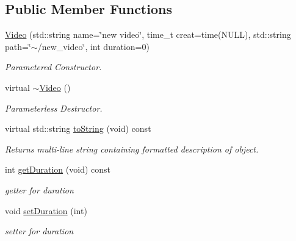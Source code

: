 \subsection*{Public Member Functions}
\begin{DoxyCompactItemize}
\item 
\hypertarget{classVideo_ad0277d8e5772008e22ac2948e03e103b}{\hyperlink{classVideo_ad0277d8e5772008e22ac2948e03e103b}{Video} (std\-::string name=\char`\"{}new video\char`\"{}, time\-\_\-t creat=time(N\-U\-L\-L), std\-::string path=\char`\"{}$\sim$/new\-\_\-video\char`\"{}, int duration=0)}\label{classVideo_ad0277d8e5772008e22ac2948e03e103b}

\begin{DoxyCompactList}\small\item\em Parametered Constructor. \end{DoxyCompactList}\item 
virtual \hyperlink{classVideo_aebf7e2a8fa2bbd79335b1cf35925d190}{$\sim$\-Video} ()
\begin{DoxyCompactList}\small\item\em Parameterless Destructor. \end{DoxyCompactList}\item 
\hypertarget{classVideo_af09cd9142969d63b514a251769fbed86}{virtual std\-::string \hyperlink{classVideo_af09cd9142969d63b514a251769fbed86}{to\-String} (void) const }\label{classVideo_af09cd9142969d63b514a251769fbed86}

\begin{DoxyCompactList}\small\item\em Returns multi-\/line string containing formatted description of object. \end{DoxyCompactList}\item 
\hypertarget{classVideo_a1a495dbb8b0389e092758c62144ebc45}{int \hyperlink{classVideo_a1a495dbb8b0389e092758c62144ebc45}{get\-Duration} (void) const }\label{classVideo_a1a495dbb8b0389e092758c62144ebc45}

\begin{DoxyCompactList}\small\item\em getter for duration \end{DoxyCompactList}\item 
\hypertarget{classVideo_a0fbbf03b902423efa2179142902bb0d0}{void \hyperlink{classVideo_a0fbbf03b902423efa2179142902bb0d0}{set\-Duration} (int)}\label{classVideo_a0fbbf03b902423efa2179142902bb0d0}

\begin{DoxyCompactList}\small\item\em setter for duration \end{DoxyCompactList}\end{DoxyCompactItemize}


